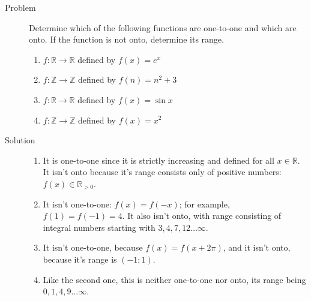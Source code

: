 \begin{description}
\item[Problem] Determine which of the following functions are one-to-one and
which are onto. If the function is not onto, determine its range.

\begin{enumerate}
\item $f : \mathbb{R} \rightarrow \mathbb{R}$ defined by $f(x) = e^x$
\item $f : \mathbb{Z} \rightarrow \mathbb{Z}$ defined by $f(n) = n^2 + 3$
\item $f : \mathbb{R} \rightarrow \mathbb{R}$ defined by $f(x) = \sin x$
\item $f : \mathbb{Z} \rightarrow \mathbb{Z}$ defined by $f(x) = x^2$
\end{enumerate}

\item[Solution]

\begin{enumerate}
\item It is one-to-one since it is strictly increasing and defined for all
$x \in \mathbb{R}$. It isn't onto because it's range consists only of positive
numbers: $f(x) \in \mathbb{R}_{>0}$.
\item It isn't one-to-one: $f(x) = f(-x)$; for example, $f(1) = f(-1) = 4$. It
also isn't onto, with range consisting of integral numbers starting with
$3, 4, 7, 12 \dots \infty$.
\item It isn't one-to-one, because $f(x) = f(x + 2\pi)$, and it isn't onto,
because it's range is $(-1; 1)$.
\item Like the second one, this is neither one-to-one nor onto, its range
being $0, 1, 4, 9 \dots \infty$.
\end{enumerate}
\end{description}
